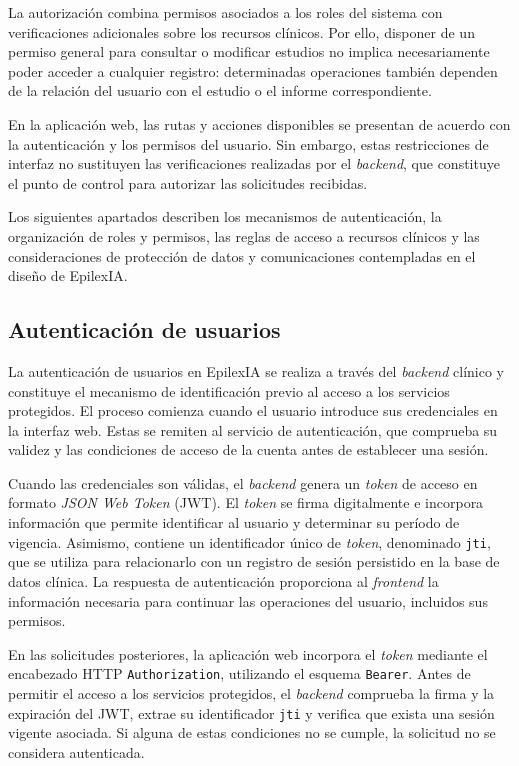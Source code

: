 La autorización combina permisos asociados a los roles del sistema con verificaciones adicionales sobre los recursos clínicos. Por ello, disponer de un permiso general para consultar o modificar estudios no implica necesariamente poder acceder a cualquier registro: determinadas operaciones también dependen de la relación del usuario con el estudio o el informe correspondiente.

En la aplicación web, las rutas y acciones disponibles se presentan de acuerdo con la autenticación y los permisos del usuario. Sin embargo, estas restricciones de interfaz no sustituyen las verificaciones realizadas por el \textit{backend}, que constituye el punto de control para autorizar las solicitudes recibidas.

Los siguientes apartados describen los mecanismos de autenticación, la organización de roles y permisos, las reglas de acceso a recursos clínicos y las consideraciones de protección de datos y comunicaciones contempladas en el diseño de EpilexIA.


\subsection{Autenticación de usuarios}
\label{subsec:autenticacion-usuarios}

La autenticación de usuarios en EpilexIA se realiza a través del \textit{backend} clínico y constituye el mecanismo de identificación previo al acceso a los servicios protegidos. El proceso comienza cuando el usuario introduce sus credenciales en la interfaz web. Estas se remiten al servicio de autenticación, que comprueba su validez y las condiciones de acceso de la cuenta antes de establecer una sesión.

Cuando las credenciales son válidas, el \textit{backend} genera un \textit{token} de acceso en formato \textit{JSON Web Token} (JWT).
 El \textit{token} se firma digitalmente e incorpora información que permite identificar al usuario y determinar su período de vigencia. Asimismo, contiene un identificador único de \textit{token}, denominado \texttt{jti}, que se utiliza para relacionarlo con un registro de sesión persistido en la base de datos clínica. La respuesta de autenticación proporciona al \textit{frontend} la información necesaria para continuar las operaciones del usuario, incluidos sus permisos.

En las solicitudes posteriores, la aplicación web incorpora el \textit{token} mediante el encabezado HTTP \texttt{Authorization}, utilizando el esquema \texttt{Bearer}. Antes de permitir el acceso a los servicios protegidos, el \textit{backend} comprueba la firma y la expiración del JWT, extrae su identificador \texttt{jti} y verifica que exista una sesión vigente asociada. Si alguna de estas condiciones no se cumple, la solicitud no se considera autenticada.

